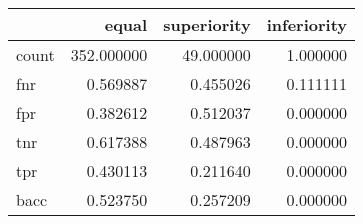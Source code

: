 \begin{tabular}{lrrr}
\toprule
{} &       equal &  superiority &  inferiority \\
\midrule
count &  352.000000 &    49.000000 &     1.000000 \\
fnr   &    0.569887 &     0.455026 &     0.111111 \\
fpr   &    0.382612 &     0.512037 &     0.000000 \\
tnr   &    0.617388 &     0.487963 &     0.000000 \\
tpr   &    0.430113 &     0.211640 &     0.000000 \\
bacc  &    0.523750 &     0.257209 &     0.000000 \\
\bottomrule
\end{tabular}
